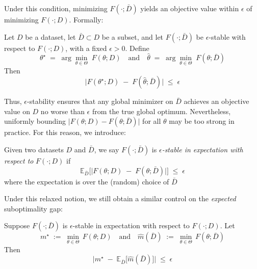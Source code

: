 Under this condition, minimizing \(F(\cdot;\bar{D})\) yields an objective value 
within \(\epsilon\) of minimizing \(F(\cdot;D)\).  Formally:

\begin{theorem}
\label{thm:eps-opt-preserve}
Let \(D\) be a dataset, let \(\bar{D}\subset D\) be a subset, and let 
\(F(\cdot;\bar{D})\) be \(\epsilon\)-stable with respect to \(F(\cdot;D)\), 
with a fixed \(\epsilon>0\).  Define
\[
  \theta^\star
  \;=\;
  \arg\!\min_{\theta\in \Theta}\;F(\theta;D)
  \quad\text{and}\quad
  \hat{\theta}
  \;=\;
  \arg\!\min_{\theta\in \Theta}\;F(\theta;\bar{D})
\]
Then
\[
    \bigl|F(\theta^\star;D)\;-\;F(\hat{\theta};\bar{D})\bigr|
    \;\le\;
    \epsilon
\]
\end{theorem}
%
Thus, \(\epsilon\)-stability ensures that any global minimizer on \(\bar{D}\) 
achieves an objective value on \(D\) no worse than \(\epsilon\) from 
the true global optimum.
%
Nevertheless, uniformly bounding \(\bigl|F(\theta;D)-F(\theta;\bar{D})\bigr|\) for all \(\theta\) may be too strong in practice. For this reason, we introduce:
\begin{definition}\label{subsec:eps-stability-expectation}
    Given two datasets \(D\) and \(\bar{D}\), we say \(F(\cdot;\bar{D})\) is 
    \emph{\(\epsilon\)-stable in expectation with respect to} \(F(\cdot;D)\) if
    \[    \mathbb{E}_{\bar{D}}\bigl[\bigl|F(\theta;D)\;-\;F(\theta;\bar{D}) \bigr|\bigr]
      \;\le\;\epsilon
    \]
    where the expectation is over the (random) choice of \(\bar{D}\)
\end{definition}
%
Under this  relaxed notion, we still obtain a similar control on the \emph{expected} suboptimality gap:
%
\begin{theorem}
\label{thm:expected-eps-stability}
Suppose \(F(\cdot;\bar{D})\) is \(\epsilon\)-stable in expectation with respect 
to \(F(\cdot;D)\).  Let 
\[
  m^\star \;:=\;\min_{\theta\in\Theta}\,F(\theta;D)
  \quad\text{and}\quad
  \widehat{m}(\bar{D}) \;:=\;\min_{\theta\in\Theta}\,F(\theta;\bar{D})
\]
Then
\[
  \bigl|
    m^\star
    \;-\;
    \mathbb{E}_{\bar{D}}\bigl[\widehat{m}(\bar{D})\bigr]
  \bigr|
  \;\le\;
  \epsilon
\]
\end{theorem}


